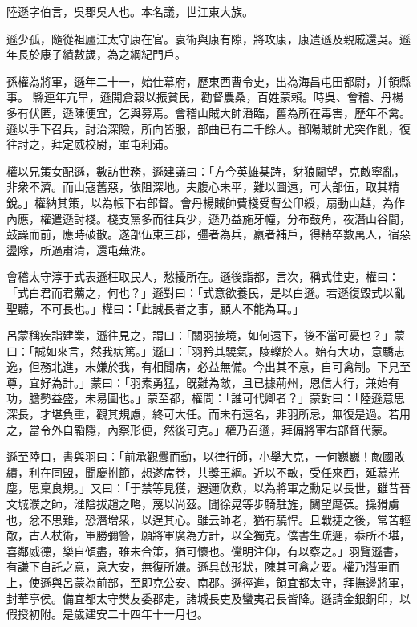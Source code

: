 \begin{pinyinscope}
 
 
 陸遜字伯言，吳郡吳人也。本名議，世江東大族。
 
 
 遜少孤，隨從祖廬江太守康在官。袁術與康有隙，將攻康，康遣遜及親戚還吳。遜年長於康子績數歲，為之綱紀門戶。
 
 
孫權為將軍，遜年二十一，始仕幕府，歷東西曹令史，出為海昌屯田都尉，并領縣事。
 縣連年亢旱，遜開倉穀以振貧民，勸督農桑，百姓蒙賴。時吳、會稽、丹楊多有伏匿，遜陳便宜，乞與募焉。會稽山賊大帥潘臨，舊為所在毒害，歷年不禽。遜以手下召兵，討治深險，所向皆服，部曲已有二千餘人。鄱陽賊帥尤突作亂，復往討之，拜定威校尉，軍屯利浦。
 
 
 
 
 權以兄策女配遜，數訪世務，遜建議曰：「方今英雄棊跱，豺狼闚望，克敵寧亂，非衆不濟。而山寇舊惡，依阻深地。夫腹心未平，難以圖遠，可大部伍，取其精銳。」權納其策，以為帳下右部督。會丹楊賊帥費棧受曹公印綬，扇動山越，為作內應，權遣遜討棧。棧支黨多而往兵少，遜乃益施牙幢，分布鼓角，夜潛山谷間，鼓譟而前，應時破散。遂部伍東三郡，彊者為兵，羸者補戶，得精卒數萬人，宿惡盪除，所過肅清，還屯蕪湖。
 
 
 
 
 會稽太守淳于式表遜枉取民人，愁擾所在。遜後詣都，言次，稱式佳吏，權曰：「式白君而君薦之，何也？」遜對曰：「式意欲養民，是以白遜。若遜復毀式以亂聖聽，不可長也。」權曰：「此誠長者之事，顧人不能為耳。」
 
 
 
 
 呂蒙稱疾詣建業，遜往見之，謂曰：「關羽接境，如何遠下，後不當可憂也？」蒙曰：「誠如來言，然我病篤。」遜曰：「羽矜其驍氣，陵轢於人。始有大功，意驕志逸，但務北進，未嫌於我，有相聞病，必益無備。今出其不意，自可禽制。下見至尊，宜好為計。」蒙曰：「羽素勇猛，旣難為敵，且已據荊州，恩信大行，兼始有功，膽勢益盛，未易圖也。」蒙至都，權問：「誰可代卿者？」蒙對曰：「陸遜意思深長，才堪負重，觀其規慮，終可大任。而未有遠名，非羽所忌，無復是過。若用之，當令外自韜隱，內察形便，然後可克。」權乃召遜，拜偏將軍右部督代蒙。
 
 
 
 
 遜至陸口，書與羽曰：「前承觀釁而動，以律行師，小舉大克，一何巍巍！敵國敗績，利在同盟，聞慶拊節，想遂席卷，共獎王綱。近以不敏，受任來西，延慕光塵，思稟良規。」又曰：「于禁等見獲，遐邇欣歎，以為將軍之勳足以長世，雖昔晉文城濮之師，淮陰拔趙之略，蔑以尚茲。聞徐晃等步騎駐旌，闚望麾葆。操猾虜也，忿不思難，恐潛增衆，以逞其心。雖云師老，猶有驍悍。且戰捷之後，常苦輕敵，古人杖術，軍勝彌警，願將軍廣為方計，以全獨克。僕書生疏遲，忝所不堪，喜鄰威德，樂自傾盡，雖未合策，猶可懷也。儻明注仰，有以察之。」羽覽遜書，有謙下自託之意，意大安，無復所嫌。遜具啟形狀，陳其可禽之要。權乃潛軍而上，使遜與呂蒙為前部，至即克公安、南郡。遜徑進，領宜都太守，拜撫邊將軍，封華亭侯。備宜都太守樊友委郡走，諸城長吏及蠻夷君長皆降。遜請金銀銅印，以假授初附。是歲建安二十四年十一月也。
 

\end{pinyinscope}
